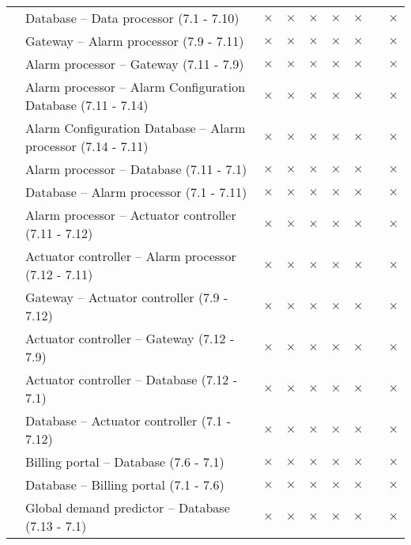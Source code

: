 \begin{longtable}{p{2.3cm} p{9cm} p{0.2cm} p{0.2cm} p{0.2cm} p{0.2cm}p{0.2cm} p{0.2cm} p{0.2cm} }
		   &  Database -- Data processor (7.1 - 7.10) & $\times$ & $\times$ & $\times$& $\times$ &  $\times$ & & $\times$\\
		   &  Gateway -- Alarm processor (7.9 - 7.11) & $\times$ & $\times$ & $\times$& $\times$ &  $\times$ & & $\times$\\
		   &  Alarm processor -- Gateway (7.11 - 7.9) & $\times$ & $\times$ & $\times$& $\times$ &  $\times$ & & $\times$\\
		   &  Alarm processor -- Alarm Configuration Database (7.11 - 7.14) & $\times$ & $\times$ & $\times$& $\times$ &  $\times$ & & $\times$\\
		   &  Alarm Configuration Database -- Alarm processor (7.14 - 7.11) & $\times$ & $\times$ & $\times$& $\times$ &  $\times$ & & $\times$\\
		   &  Alarm processor -- Database (7.11 - 7.1) & $\times$ & $\times$ & $\times$& $\times$ &  $\times$ & & $\times$\\
		   &  Database -- Alarm processor (7.1 - 7.11) & $\times$ & $\times$ & $\times$& $\times$ &  $\times$ & & $\times$\\
		   &  Alarm processor -- Actuator controller (7.11 - 7.12) & $\times$ & $\times$ & $\times$& $\times$ &  $\times$ & & $\times$\\
		   &  Actuator controller -- Alarm processor (7.12 - 7.11) & $\times$ & $\times$ & $\times$& $\times$ &  $\times$ & & $\times$\\
		   &  Gateway -- Actuator controller (7.9 - 7.12) & $\times$ & $\times$ & $\times$& $\times$ &  $\times$ & & $\times$\\
		   &  Actuator controller -- Gateway (7.12 - 7.9) & $\times$ & $\times$ & $\times$& $\times$ &  $\times$ & & $\times$\\
		   &  Actuator controller -- Database (7.12 - 7.1) & $\times$ & $\times$ & $\times$& $\times$ &  $\times$ & & $\times$\\
		   &  Database -- Actuator controller (7.1 - 7.12) & $\times$ & $\times$ & $\times$& $\times$ &  $\times$ & & $\times$\\
		   &  Billing portal -- Database (7.6 - 7.1) & $\times$ & $\times$ & $\times$& $\times$ &  $\times$ & & $\times$\\
		   &  Database -- Billing portal (7.1 - 7.6) & $\times$ & $\times$ & $\times$& $\times$ &  $\times$ & & $\times$\\
		   &  Global demand predictor -- Database (7.13 - 7.1) & $\times$ & $\times$ & $\times$& $\times$ &  $\times$ & & $\times$\\

\end{longtable}
